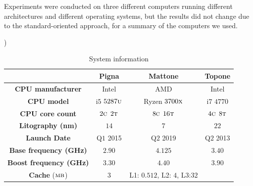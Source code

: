 Experiments were conducted on three different computers running different architectures and
different operating systems, but the results did not change due to the standard-oriented approach,
 for a summary of the computers we used.
\begin{center})
	\begin{longtable}{|c|c|c|c|}
		\caption{System information}\label{tbl:computers}
		\\\textbf{}                             & \textbf{Pigna}
		                                                & \textbf{Mattone}
		                                                & \textbf{Topone}
		\\\hline\hline
		\endfirsthead\hline\endlastfoot

		\textbf{CPU manufacturer}                       & Intel
		                                                & AMD
		                                                & Intel
		\\\hline
		\textbf{CPU model}                              & i$5$ $5287\textsc{u}$
		                                                & Ryzen $3700\textsc{x}$
		                                                & i$7$ $4770$
		\\\hline
		\textbf{CPU core count}                         & $2\textsc{c}$ $2\textsc{t}$
		                                                & $8\textsc{c}$ $16\textsc{t}$
		                                                & $4\textsc{c}$ $8\textsc{t}$
		\\\hline
		\textbf{Litography (nm)}                        & $14$
		                                                & $7$
		                                                & $22$
		\\\hline
		\textbf{Launch Date}                            & Q$1$ 2015
		                                                & Q$2$ 2019
		                                                & Q$2$ 2013
		\\\hline
		\textbf{Base frequency (GHz)}                   & $2.90$
		                                                & $4.125$
		                                                & $3.40$
		\\\hline
		\textbf{Boost frequency (GHz)}                  & $3.30$
		                                                & $4.40$
		                                                & $3.90$
		\\\hline
		\textbf{Cache} ($\textsc{mb}$)                  & $3$
		                                                & L1: $0.512$, L2: $4$, L3:$32$

\end{longtable}
\end{center}
